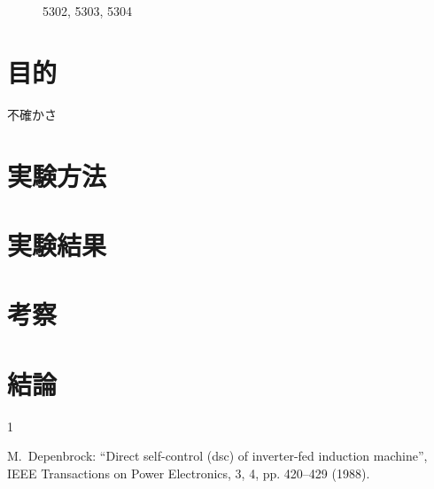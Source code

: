 \documentclass{style}
\begin{document}
\begin{figure}[t!]
    \centering
    \begin{defbox}
        5302, 5303, 5304
    \end{defbox}
\end{figure}

\section{目的}
不確かさ\par
\section{実験方法}
\section{実験結果}
\section{考察}
\section{結論}




 {
  \vspace{1em}\fontsize{7.09pt}{10.63pt}\selectfont
  \renewcommand{\section}[2]{
      \begin{center}\textbf{◆~{#2}~◆}\end{center}
  }
  \begin{thebibliography}{1}

      M.~Depenbrock: ``Direct self-control (dsc) of inverter-fed induction machine'', IEEE Transactions on Power Electronics, \textsf{3}, 4, pp. 420--429 (1988).

  \end{thebibliography}
 }
\end{document}
